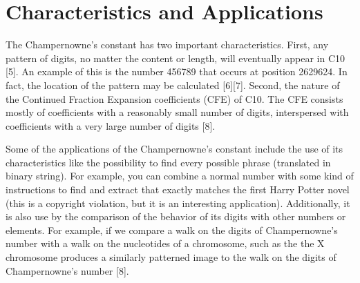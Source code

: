 \documentclass{article}
\begin{document}
\section*{Characteristics and Applications} %

The Champernowne’s constant has two important characteristics. First, any pattern of digits, no matter the content or length, will eventually appear in C10 [5].  An example of this is the number 456789 that occurs at position 2629624. In fact, the location of the pattern may be calculated [6][7]. Second, the nature of the Continued Fraction Expansion coefficients (CFE) of C10. The CFE consists mostly of coefficients with a reasonably small number of digits, interspersed with coefficients with a very large number of digits [8].

Some of the applications of the Champernowne’s constant include the use of its characteristics like the possibility to find every possible phrase (translated in binary string). For example, you can combine a normal number with some kind of instructions to find and extract that exactly matches the first Harry Potter novel (this is a copyright violation, but it is an interesting application). Additionally, it is also use by the comparison of the behavior of its digits with other numbers or elements. For example, if we compare a walk on the digits of Champernowne’s number with a walk on the nucleotides of a chromosome, such as the the X chromosome produces a similarly patterned image to the walk on the digits of Champernowne’s number [8].
\end{document}
